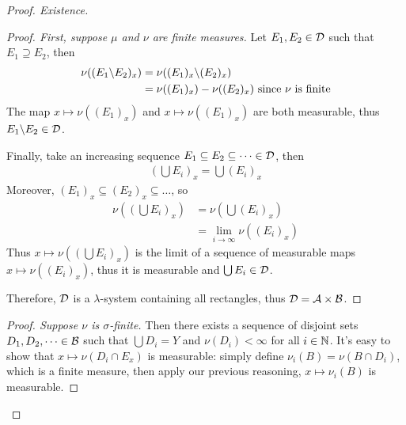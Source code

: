 \documentclass[11pt]{article}
\begin{document}
\begin{theorem}
\begin{proof}[Proof. Existence]
\begin{proposition}
\begin{proof}[Proof. First, suppose $\mu$ and $\nu$ are finite measures]
					Let $E_1, E_2 \in \mathcal{{D}}$ such that $E_1 \supseteq E_2$, then
					\begin{align}
						\nu((E_1 \backslash E_2)_x) &= \nu((E_1)_x \backslash (E_2)_x) \\
						&= \nu((E_1)_x) - \nu((E_2)_x) \text{{ since $\nu$ is finite}}
					\end{align}
					The map $x \mapsto \nu((E_1)_x)$ and $x \mapsto \nu((E_1)_x)$ are both measurable, thus $E_1 \backslash E_2 \in \mathcal{{D}}$.
					
					Finally, take an increasing sequence $E_1 \subseteq E_2 \subseteq \dots \in \mathcal{{D}}$, then
					\begin{align}
						\left(\bigcup E_i\right)_x = \bigcup (E_i)_x
					\end{align}
					Moreover, $(E_1)_x \subseteq (E_2)_x \subseteq \dots$, so
					\begin{align}
						\nu\left(\left(\bigcup E_i\right)_x\right) &= \nu\left(\bigcup (E_i)_x\right) \\
						&= \lim_{i \to \infty} \nu((E_i)_x)
					\end{align}
					Thus $x \mapsto \nu\left(\left(\bigcup E_i\right)_x\right)$ is the limit of a sequence of measurable maps $x \mapsto \nu((E_i)_x)$, thus it is measurable and $\bigcup E_i \in \mathcal{{D}}$.
					
					Therefore, $\mathcal{{D}}$ is a $\lambda$-system containing all rectangles, thus $\mathcal{{D}} = \mathcal{{A}} \times \mathcal{{B}}$.
				\end{proof}
				\begin{proof}[Proof. Suppose $\nu$ is $\sigma$-finite]
					Then there exists a sequence of disjoint sets $D_1, D_2, \dots \in \mathcal{{B}}$ such that $\bigcup D_i = Y$ and $\nu(D_i) < \infty$ for all $i \in \mathbb{N}$.
					It's easy to show that $x \mapsto \nu(D_i \cap E_x)$ is measurable: simply define $\nu_i(B) = \nu(B \cap D_i)$, which is a finite measure, then apply our previous reasoning, $x \mapsto \nu_i(B)$ is measurable.
					

\end{proof}
\end{proposition}
\end{proof}
\end{theorem}
\end{document}
